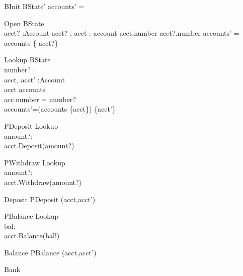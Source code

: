 \begin{schema}{BInit}
 BState'
\where
accounts' = \emptyset 
\end{schema}


\begin{schema}{Open}
 \Delta BState \\
acct? :Account
\where
acct? \neq \ohcircnull ;
\forall acct : account \spot acct.number \neq acct?.number
accounts' = accounts \cup \{ acct?\}
\end{schema}


\begin{schema}{Lookup}
 \Delta BState \\
number? : \nat\\
acct, acct' :Account\\
\where
acct \in accounts \\
acc.number = number?\\
accounts'=(accounts \setminus \{acct\}) \cup \{acct'\}\\
\end{schema}


\begin{schema}{PDeposit}
 Lookup\\
 amount?:\nat\\
 \where
 acct.Deposit(amount?)
\end{schema}

\begin{schema}{PWithdraw}
 Lookup\\
 amount?:\nat\\
 \where
 acct.Withdraw(amount?)
\end{schema}

\begin{schema}{Deposit}
 PDeposit \setminus (acct,acct') \\
\end{schema}

\begin{schema}{PBalance}
 Lookup\\
 bal:\nat\\
 \where
 acct.Balance(bal!)
\end{schema}

\begin{schema}{Balance}
PBalance \setminus (acct,acct') \\
\end{schema}

\begin{circus}
\circprocess Bank \circdef \circbegin\\
\end{circus}


